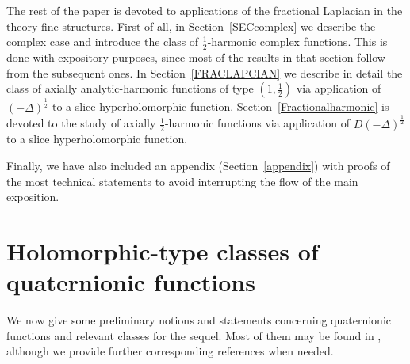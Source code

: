 \documentclass[reqno,11pt]{amsart}
\theoremstyle{definition}
\begin{document}
The rest of the paper is devoted to applications of the fractional Laplacian in the theory fine structures. First of all, in Section~\ref{SECcomplex} we describe the complex case   and introduce the class of $\frac{1}{2}$-harmonic complex functions. This is done with expository purposes, since most of the results in that section follow from the subsequent ones. In Section~\ref{FRACLAPCIAN} we describe in detail the class of axially analytic-harmonic functions of type $(1,\frac{1}{2})$ via application of $(-\Delta)^\frac{1}{2}$ to a slice hyperholomorphic function. Section~\ref{Fractionalharmonic} is devoted to the study of axially $\frac{1}{2}$-harmonic functions via application of $D(-\Delta)^\frac{1}{2}$ to a slice hyperholomorphic function.

Finally, we have also included an appendix (Section~\ref{appendix}) with proofs of the most technical statements to avoid interrupting the flow of the main exposition.


\section{Holomorphic-type classes of quaternionic functions}\label{Preliminary material}


We now give some preliminary notions and statements concerning quaternionic functions and relevant classes for the sequel. Most of them may be found in \cite{CGK}, although we provide further corresponding references when needed.
\end{document}
